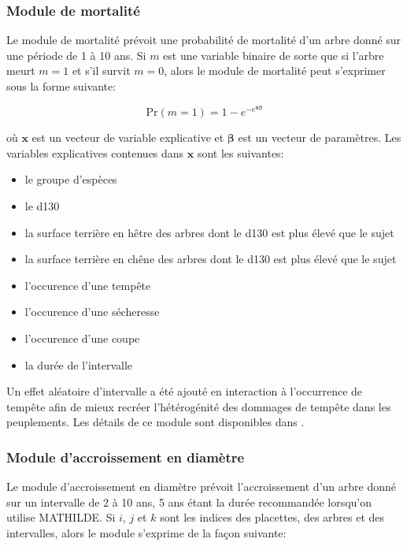 \documentclass[a4paper,12pt]{article}
\def\vect#1{\bm{#1}}
\begin{document}
\subsubsection{Module de mortalité}

Le module de mortalité prévoit une probabilité de mortalité d'un arbre donné sur une période de 1 à 10 ans. Si $m$ est une variable binaire de sorte que si l'arbre meurt $m=1$ et s'il survit $m=0$, alors le module de mortalité peut s'exprimer sous la forme suivante:

\begin{equation}
\text{Pr}(m=1) = 1 - e^{-e^{\vect{x}\vect{\beta}}}
\end{equation}

où $\vect{x}$ est un vecteur de variable explicative et $\vect{\beta}$ est un vecteur de paramètres. Les variables explicatives contenues dans $\vect{x}$ sont les suivantes:

\begin{itemize}
  \item le groupe d'espèces
  \item le d130
  \item la surface terrière en hêtre des arbres dont le d130 est plus élevé que le sujet
  \item la surface terrière en chêne des arbres dont le d130 est plus élevé que le sujet
  \item l'occurence d'une tempête
  \item l'occurence d'une sécheresse
  \item l'occurence d'une coupe
  \item la durée de l'intervalle
\end{itemize}

Un effet aléatoire d'intervalle a été ajouté en interaction à l'occurrence de tempête afin de mieux recréer l'hétérogénité des dommages de tempête dans les peuplements. Les détails de ce module sont disponibles dans \citet{manso_mortalite_2015}. 

\subsubsection{Module d'accroissement en diamètre}

Le module d'accroissement en diamètre prévoit l'accroissement d'un arbre donné sur un intervalle de 2 à 10 ans, 5 ans étant la durée recommandée lorsqu'on utilise MATHILDE. Si $i$, $j$ et $k$ sont les indices des placettes, des arbres et des intervalles, alors le module s'exprime de la façon suivante:
\end{document}
